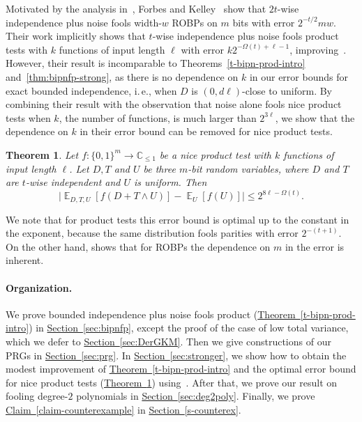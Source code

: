 \documentclass[11pt]{article}
\numberwithin{equation}{section}
\newtheorem{theorem}{Theorem}[section]
\theoremstyle{definition}
\theoremstyle{plain}
\newcommand{\C}{\mathbb C}
\newcommand{\ie}{i.\,e.}
\newcommand{\expref}[2]{\hyperref[#2]{#1~\ref{#2}}}
\newcommand{\zo}{\{0,1\}}
\def\Blocklength{\ell}
\DeclareMathOperator*{\E}{\mathbb{E}}                 %
\begin{document}
Motivated by the analysis in~\cite{HaramatyLV-bipnfp}, Forbes and Kelley~\cite{ForbesK18} show that $2t$-wise independence plus noise fools width-$w$ ROBPs on $m$ bits with error $2^{-t/2} mw$.
Their work implicitly shows that $t$-wise independence plus noise fools product tests with $k$ functions of input length $\Blocklength$ with error $k 2^{-\Omega(t)+\Blocklength-1}$, improving~\cite{HaramatyLV-bipnfp}.
However, their result is incomparable to Theorems~\ref{t-bipn-prod-intro} and~\ref{thm:bipnfp-strong}, as there is no dependence on $k$ in our error bounds for exact bounded independence, \ie, when $D$ is $(0,d\Blocklength)$-close to uniform.
By combining their result with the observation that noise alone fools nice product tests when $k$, the number of functions, is much
larger than $2^{3\Blocklength}$, we show that the dependence on $k$ in their error bound can be removed for nice product tests.
  \begin{theorem}\label{thm:bipnfp-optimal}
    Let $f\colon \zo^m \to \C_{\le 1}$ be a nice product test with $k$ functions of input length $\Blocklength$.
    Let $D,T$ and $U$ be three $m$-bit random variables, where $D$ and $T$ are $t$-wise independent and $U$ is uniform. %
    Then
    \[
      \Big| \E_{D,T,U}[f(D + T \wedge U)] - \E_U[f(U)] \Big| \le 2^{8\Blocklength - \Omega(t)} .
    \]
  \end{theorem}
We note that for product tests this error bound is optimal up to the constant in the exponent, because the same distribution fools parities with error $2^{-(t+1)}$.
On the other hand, \cite[Theorem~8]{BoppanaHLV19} shows that for ROBPs the dependence on $m$ in the error is inherent.

\paragraph{Organization.}
We prove bounded independence plus noise fools product (\expref{Theorem}{t-bipn-prod-intro}) in \expref{Section}{sec:bipnfp}, except the proof of the case of low total variance, which we defer to \expref{Section}{sec:DerGKM}.
Then we give constructions of our PRGs in \expref{Section}{sec:prg}.
In \expref{Section}{sec:stronger}, we show how to obtain the modest improvement of \expref{Theorem}{t-bipn-prod-intro} and the optimal error bound for nice product tests (\expref{Theorem}{thm:bipnfp-optimal}) using~\cite{ForbesK18}.
After that, we prove our result on fooling degree-$2$ polynomials in \expref{Section}{sec:deg2poly}.
Finally, we prove \expref{Claim}{claim-counterexample} in \expref{Section}{s-counterex}.
\end{document}
